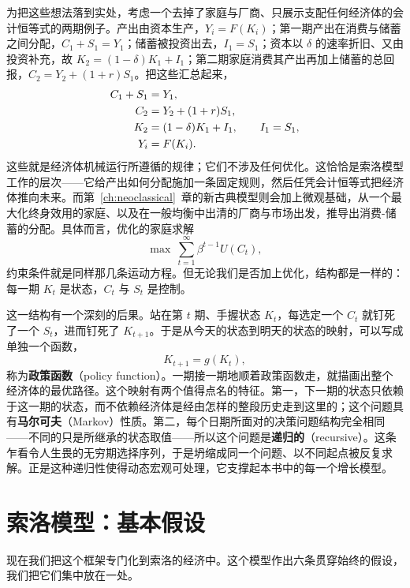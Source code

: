 
为把这些想法落到实处，考虑一个去掉了家庭与厂商、只展示支配任何经济体的会计恒等式的两期例子。产出由资本生产，$Y_i = F(K_i)$；第一期产出在消费与储蓄之间分配，$C_1 + S_1 = Y_1$；储蓄被投资出去，$I_1 = S_1$；资本以 $\delta$ 的速率折旧、又由投资补充，故 $K_2 = (1-\delta)K_1 + I_1$；第二期家庭消费其产出再加上储蓄的总回报，$C_2 = Y_2 + (1+r)S_1$。把这些汇总起来，
\[
\begin{aligned}
C_1 + S_1 &= Y_1, \\
C_2 &= Y_2 + (1+r) S_1, \\
K_2 &= (1-\delta)K_1 + I_1, \qquad I_1 = S_1, \\
Y_i &= F(K_i).
\end{aligned}
\]
这些就是经济体机械运行所遵循的规律；它们不涉及任何优化。这恰恰是索洛模型工作的层次——它给产出如何分配施加一条固定规则，然后任凭会计恒等式把经济体推向未来。而第~\ref{ch:neoclassical}~章的新古典模型则会加上微观基础，从一个最大化终身效用的家庭、以及在一般均衡中出清的厂商与市场出发，推导出消费-储蓄的分配。具体而言，优化的家庭求解
\[
\max \ \sum_{t=1}^{\infty} \beta^{t-1} U(C_t),
\]
约束条件就是同样那几条运动方程。但无论我们是否加上优化，结构都是一样的：每一期 $K_t$ 是状态，$C_t$ 与 $S_t$ 是控制。

这一结构有一个深刻的后果。站在第 $t$ 期、手握状态 $K_t$，每选定一个 $C_t$ 就钉死了一个 $S_t$，进而钉死了 $K_{t+1}$。于是从今天的状态到明天的状态的映射，可以写成单独一个函数，
\[
K_{t+1} = g(K_t),
\]
称为\textbf{政策函数}（policy function）。一期接一期地顺着政策函数走，就描画出整个经济体的最优路径。这个映射有两个值得点名的特征。第一，下一期的状态只依赖于这一期的状态，而不依赖经济体是经由怎样的整段历史走到这里的；这个问题具有\textbf{马尔可夫}（Markov）性质。第二，每个日期所面对的决策问题结构完全相同——不同的只是所继承的状态取值——所以这个问题是\textbf{递归的}（recursive）。这条乍看令人生畏的无穷期选择序列，于是坍缩成同一个问题、以不同起点被反复求解。正是这种递归性使得动态宏观可处理，它支撑起本书中的每一个增长模型。

\section{索洛模型：基本假设}

现在我们把这个框架专门化到索洛的经济中。这个模型作出六条贯穿始终的假设，我们把它们集中放在一处。

